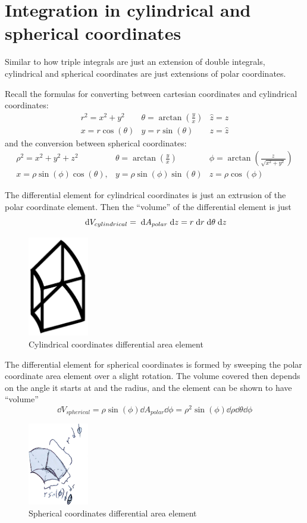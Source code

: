 \documentclass[letterpaper,11pt]{article}
\begin{document}
\section*{Integration in cylindrical and spherical coordinates}
Similar to how triple integrals are just an extension of double integrals,
cylindrical and spherical coordinates are just extensions of polar coordinates.

Recall the formulas for converting between cartesian coordinates and cylindrical coordinates:
$$
\begin{array}{ccc}
  r^2 = x^2 + y^2     & \theta = \arctan \left( \frac{y}{x} \right) & \hat{z} = z\\
  x = r \cos(\theta) & y = r \sin(\theta)                           & z = \hat{z}
\end{array}
$$
and the conversion between spherical coordinates:
$$
\begin{array}{ccc}
  \rho^2 = x^2 + y^2 + z^2 & \theta = \arctan \left( \frac{y}{x} \right) & \phi = \arctan \left( \frac{z}{\sqrt{x^2 + y^2}} \right)\\
  x = \rho \sin(\phi) \cos(\theta), & y = \rho \sin(\phi) \sin(\theta) & z = \rho \cos(\phi)
\end{array}
$$

The differential element for cylindrical coordinates is just an extrusion of the polar coordinate element.
Then the ``volume'' of the differential element is just
$$\;\mathrm{d}V_{cylindrical} = \;\mathrm{d}A_{polar} \;\mathrm{d}z = r \;\mathrm{d}r \;\mathrm{d}\theta \;\mathrm{d}z$$
\begin{figure}[h]
  \centering \includegraphics[width=100px]{mech222/worksheet_2b_cylinder_diff_elem.png}
  \caption{Cylindrical coordinates differential area element}
\end{figure}

The differential element for spherical coordinates is formed by sweeping the polar coordinate area element over a slight rotation.
The volume covered then depends on the angle it starts at and the radius, and the element can be shown to have ``volume''
$$\dd{V}_{spherical} = \rho \sin(\phi) \dd{A}_{polar} \dd{\phi} = \rho^2 \sin(\phi) \dd{\rho} \dd{\theta} \dd{\phi}$$
\begin{figure}[h]
  \centering \includegraphics[width=100px]{mech222/worksheet_2b_spherical_diff_elem.png}
  \caption{Spherical coordinates differential area element}
\end{figure}
\end{document}
